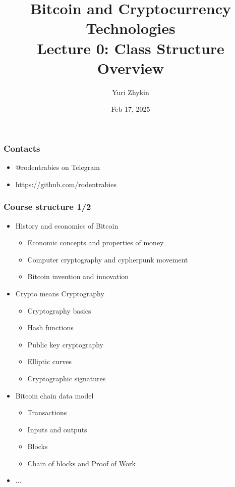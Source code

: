 \documentclass{beamer}
\title{
  Bitcoin and Cryptocurrency Technologies \\
  Lecture 0: Class Structure Overview
}
\author{Yuri Zhykin}
\date{Feb 17,  2025}
\begin{document}
\frame{\titlepage}

\begin{frame}
  \frametitle{Contacts}
  \begin{itemize}
  \item @rodentrabies on Telegram
  \item https://github.com/rodentrabies
  \end{itemize}
\end{frame}

\begin{frame}
  \frametitle{Course structure 1/2}
  \begin{itemize}
  \item History and economics of Bitcoin
    \begin{itemize}
    \item Economic concepts and properties of money
    \item Computer cryptography and cypherpunk movement
    \item Bitcoin invention and innovation
    \end{itemize}
  \item Crypto means Cryptography
    \begin{itemize}
    \item Cryptography basics
    \item Hash functions
    \item Public key cryptography
    \item Elliptic curves
    \item Cryptographic signatures
    \end{itemize}
  \item Bitcoin chain data model
    \begin{itemize}
    \item Transactions
    \item Inputs and outputs
    \item Blocks
    \item Chain of blocks and Proof of Work
    \end{itemize}
  \item[] ...
  \end{itemize}
\end{frame}
\end{document}
